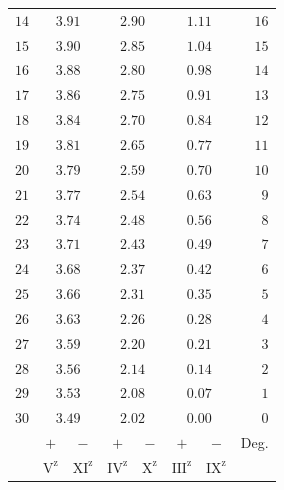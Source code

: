\begin{center}
\begin{tabular}{r||cc|cc|cc||r}
$14$&\multicolumn{2}{c|}{$3.91$}&\multicolumn{2}{c|}{$2.90$}&\multicolumn{2}{c||}{$1.11$}&$16$\\
$15$&\multicolumn{2}{c|}{$3.90$}&\multicolumn{2}{c|}{$2.85$}&\multicolumn{2}{c||}{$1.04$}&$15$\\[3pt]
$16$&\multicolumn{2}{c|}{$3.88$}&\multicolumn{2}{c|}{$2.80$}&\multicolumn{2}{c||}{$0.98$}&$14$\\
$17$&\multicolumn{2}{c|}{$3.86$}&\multicolumn{2}{c|}{$2.75$}&\multicolumn{2}{c||}{$0.91$}&$13$\\
$18$&\multicolumn{2}{c|}{$3.84$}&\multicolumn{2}{c|}{$2.70$}&\multicolumn{2}{c||}{$0.84$}&$12$\\
$19$&\multicolumn{2}{c|}{$3.81$}&\multicolumn{2}{c|}{$2.65$}&\multicolumn{2}{c||}{$0.77$}&$11$\\
$20$&\multicolumn{2}{c|}{$3.79$}&\multicolumn{2}{c|}{$2.59$}&\multicolumn{2}{c||}{$0.70$}&$10$\\[3pt]
$21$&\multicolumn{2}{c|}{$3.77$}&\multicolumn{2}{c|}{$2.54$}&\multicolumn{2}{c||}{$0.63$}&$9$\\
$22$&\multicolumn{2}{c|}{$3.74$}&\multicolumn{2}{c|}{$2.48$}&\multicolumn{2}{c||}{$0.56$}&$8$\\
$23$&\multicolumn{2}{c|}{$3.71$}&\multicolumn{2}{c|}{$2.43$}&\multicolumn{2}{c||}{$0.49$}&$7$\\
$24$&\multicolumn{2}{c|}{$3.68$}&\multicolumn{2}{c|}{$2.37$}&\multicolumn{2}{c||}{$0.42$}&$6$\\
$25$&\multicolumn{2}{c|}{$3.66$}&\multicolumn{2}{c|}{$2.31$}&\multicolumn{2}{c||}{$0.35$}&$5$\\[3pt]
$26$&\multicolumn{2}{c|}{$3.63$}&\multicolumn{2}{c|}{$2.26$}&\multicolumn{2}{c||}{$0.28$}&$4$\\
$27$&\multicolumn{2}{c|}{$3.59$}&\multicolumn{2}{c|}{$2.20$}&\multicolumn{2}{c||}{$0.21$}&$3$\\
$28$&\multicolumn{2}{c|}{$3.56$}&\multicolumn{2}{c|}{$2.14$}&\multicolumn{2}{c||}{$0.14$}&$2$\\
$29$&\multicolumn{2}{c|}{$3.53$}&\multicolumn{2}{c|}{$2.08$}&\multicolumn{2}{c||}{$0.07$}&$1$\\
$30$&\multicolumn{2}{c|}{$3.49$}&\multicolumn{2}{c|}{$2.02$}&\multicolumn{2}{c||}{$0.00$}&$0$\\
\hline
&$+$&$-$&$+$&$-$&$+$&$-$&Deg.\\
&$\mathrm V^{\mathrm z}$&$\mathrm{XI}^{\mathrm z}$&$\mathrm{IV}^{\mathrm z}$&$\mathrm X^{\mathrm z}$&$\mathrm{III}^{\mathrm z}$&$\mathrm{IX}^{\mathrm z}$&
\end{tabular}
\endgroup
\end{center}
